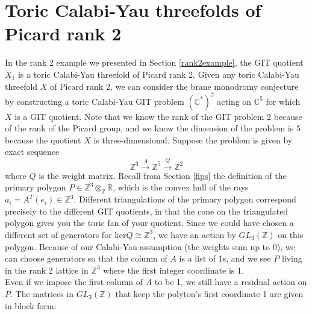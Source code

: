 \documentclass[oneside,reqno]{amsart}
\theoremstyle{definition}
\theoremstyle{definition}
\theoremstyle{definition}
\theoremstyle{definition}
\newcommand{\CC}{\mathbb{C}}
\newcommand{\Z}{\mathbb{Z}}
\newcommand{\R}{\mathbb{R}}
\begin{document}
\section{Toric Calabi-Yau threefolds of Picard rank 2}
\label{future}
In the rank 2 example we presented in Section \ref{rank2example}, the GIT quotient $X_1$ is a toric Calabi-Yau threefold of Picard rank 2. Given any toric Calabi-Yau threefold $X$ of Picard rank 2, we can consider the brane monodromy conjecture by constructing a toric Calabi-Yau GIT problem $(\CC^*)^2$ acting on $\CC^5$ for which $X$ is a GIT quotient. Note that we know the rank of the GIT problem 2 because of the rank of the Picard group, and we know the dimension of the problem is 5 because the quotient $X$ is three-dimensional. Suppose the problem is given by exact sequence
$$
\Z^3 \xrightarrow{A} \Z^5 \xrightarrow{Q} \Z^2
$$
where $Q$ is the weight matrix. Recall from Section \ref{fips} the definition of the primary polygon $P \in \Z^3 \otimes_{\Z} \R$, which is the convex hull of the rays $a_i = A^T(e_i) \in \Z^{3}$. Different triangulations of the primary polygon correspond precisely to the different GIT quotients, in that the cone on the triangulated polygon gives you the toric fan of your quotient. Since we could have chosen a different set of generators for $\text{ker}Q \cong \Z^3$, we have an action by $GL_3(\Z)$ on this polygon. Because of our Calabi-Yau assumption (the weights sum up to 0), we can choose generators so that the column of $A$ is a list of 1s, and we see $P$ living in the rank 2 lattice in $\Z^3$ where the first integer coordinate is 1. \\
\newline
Even if we impose the first column of $A$ to be 1, we still have a residual action on $P$. The matrices in $GL_3(\Z)$ that keep the polyton's first coordinate 1 are given in block form:
\end{document}
